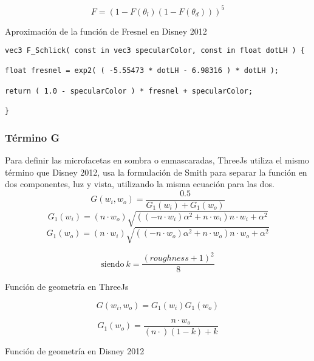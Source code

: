   \begin{eqfloat}[!htb]
    \begin{equation}
      F= (1 - F(\theta_l) (1 - F(\theta_d)))^5
    \end{equation}
  \caption{Aproximaci\'on de la funci\'on de Fresnel en Disney 2012}
  \end{eqfloat}

  \newpage
  \begin{lstlisting}[caption=Implementaci\'on en ThreeJs de la aproximaci\'on a la funci\'on de Fresnel]
vec3 F_Schlick( const in vec3 specularColor, const in float dotLH ) {

float fresnel = exp2( ( -5.55473 * dotLH - 6.98316 ) * dotLH );

return ( 1.0 - specularColor ) * fresnel + specularColor;

}
  \end{lstlisting}
  \singlespacing

  \subsubsection{T\'ermino G}
  Para definir las microfacetas en sombra o enmascaradas, ThreeJs utiliza el mismo t\'ermino que Disney 2012, usa
  la formulaci\'on de Smith para separar la funci\'on en dos componentes, luz y vista, utilizando la misma ecuaci\'on
  para las dos.\\

  $$
  G(w_i, w_o) = \frac{0.5}{G_1(w_i) + G_1(w_o)}
  $$
  \singlespacing
  $$
  G_1(w_i) = (n \cdot{w_o}) \sqrt{((-n\cdot{w_i}) \alpha^2 + n\cdot{w_i}) n\cdot{w_i} + \alpha^2}
  $$
  \singlespacing
  $$
  G_1(w_o) = (n \cdot{w_i}) \sqrt{((-n\cdot{w_o}) \alpha^2 + n\cdot{w_o}) n\cdot{w_o} + \alpha^2}
  $$
  \begin{eqfloat}[!htb]
    \begin{equation}
      \textrm{siendo}\ k = \frac{(roughness + 1)^2}{8}
    \end{equation}
  \caption{Funci\'on de geometr\'ia en ThreeJs}
  \end{eqfloat}
  \singlespacing

  $$
  G(w_i, w_o) = G_1(w_i)G_1(w_o)
  $$

  \begin{eqfloat}[!htb]
    \begin{equation}
      G_1(w_o) = \frac{n\cdot{w_o}}{(n\cdot) (1 - k) + k}
    \end{equation}
  \caption{Funci\'on de geometr\'ia en Disney 2012}
  \end{eqfloat}
  \singlespacing

